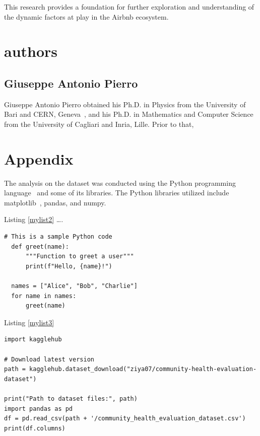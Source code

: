 \documentclass[10pt, conference, compsocconf]{IEEEtran}
\begin{document}
This research provides a foundation for further exploration and understanding of the dynamic factors at play in the Airbnb ecosystem.

\lipsum[1]

\section{authors}
\subsection{Giuseppe Antonio Pierro}
Giuseppe Antonio Pierro obtained his Ph.D. in Physics from the University of Bari and CERN, Geneva~\cite{cern},
and his Ph.D. in Mathematics and Computer Science from the University of Cagliari and Inria, Lille. 
Prior to that, \lipsum[1]

\section{Appendix}

The analysis on the dataset was conducted using the Python programming language~\cite{rayhanrise, van1995python} and some of its libraries. 
The Python libraries utilized include matplotlib~\cite{Hunter:2007}, pandas, and numpy.

\lipsum[2-3]

Listing \ref{mylist2} \dots.

\begin{lstlisting}[style=inferno, label={mylist2}, caption={Recursive Factorial Function}, linewidth=\columnwidth]
  # This is a sample Python code
  def greet(name):
      """Function to greet a user"""
      print(f"Hello, {name}!")
  
  names = ["Alice", "Bob", "Charlie"]
  for name in names:
      greet(name)
\end{lstlisting}

\lipsum[4]
  

Listing \ref{mylist3} \lipsum[1]
\begin{lstlisting}[style=inferno , label={mylist3}, caption={Recursive Factorial Function}, linewidth=\columnwidth] 
import kagglehub

# Download latest version
path = kagglehub.dataset_download("ziya07/community-health-evaluation-dataset")

print("Path to dataset files:", path)
import pandas as pd
df = pd.read_csv(path + '/community_health_evaluation_dataset.csv')
print(df.columns)
\end{lstlisting}




\end{document}
